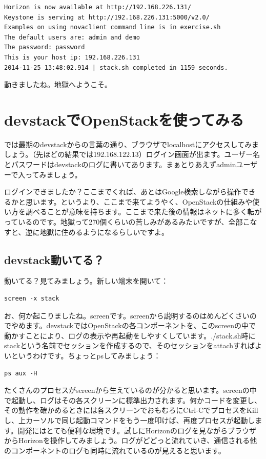 \documentclass[9pt,b5paper,tombo,openany]{jsbook}
\begin{document}
\begin{lstlisting}
Horizon is now available at http://192.168.226.131/
Keystone is serving at http://192.168.226.131:5000/v2.0/
Examples on using novaclient command line is in exercise.sh
The default users are: admin and demo
The password: password
This is your host ip: 192.168.226.131
2014-11-25 13:48:02.914 | stack.sh completed in 1159 seconds.
\end{lstlisting}

動きましたね。地獄へようこそ。

\section{devstackでOpenStackを使ってみる}

では最期のdevstackからの言葉の通り、ブラウザでlocalhostにアクセスしてみましょう。（先ほどの結果では192.168.122.13）ログイン画面が出ます。ユーザー名とパスワードはdevstackのログに書いてあります。まぁとりあえずadminユーザーで入ってみましょう。

ログインできましたか？ここまでくれば、あとはGoogle検索しながら操作できるかと思います。というより、ここまで来てようやく、OpenStackの仕組みや使い方を調べることが意味を持ちます。ここまで来た後の情報はネットに多く転がっているのです。地獄って270個くらいの苦しみがあるみたいですが、全部こなすと、逆に地獄に住めるようになるらしいですよ。

\subsection{devstack動いてる？}

動いてる？見てみましょう。新しい端末を開いて：

\begin{lstlisting}
screen -x stack
\end{lstlisting}

お、何か起こりましたね。screenです。screenから説明するのはめんどくさいのでやめます。devstackではOpenStackの各コンポーネントを、このscreenの中で動かすことにより、ログの表示や再起動をしやすくしています。./stack.sh時にstackという名前でセッションを作成するので、そのセッションをattachすればよいというわけです。ちょっとpsしてみましょう：

\begin{lstlisting}
ps aux -H
\end{lstlisting}

たくさんのプロセスがscreenから生えているのが分かると思います。screenの中で起動し、ログはその各スクリーンに標準出力されます。何かコードを変更し、その動作を確かめるときには各スクリーンでおもむろにCtrl-CでプロセスをKillし、上カーソルで同じ起動コマンドをもう一度叩けば、再度プロセスが起動します。開発にはとても便利な環境です。試しにHorizonのログを見ながらブラウザからHorizonを操作してみましょう。ログがどどっと流れていき、通信される他のコンポーネントのログも同時に流れているのが見えると思います。
\end{document}
